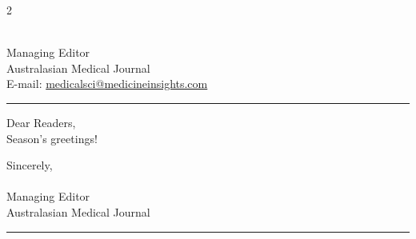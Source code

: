 \documentclass{article}
\begin{document}
\begin{multicols*}{2}
\sloppy
\raggedcolumns
\setlength{\parindent}{0pt}
\setlength{\parskip}{0pt}
\fontsize{10}{12}\sffamily\color{color_29791}
\par
\vspace*{-5pt}
{\setlength{\leftskip}{8pt}
\\[0.3em]
Managing Editor\\
Australasian Medical Journal\\
E-mail: \textcolor{color_33106}{\href{mailto:medicalsci@medicineinsights.com}{medicalsci@medicineinsights.com}}\par}

\noindent\rule{\linewidth}{2.2pt}
\vspace*{-7pt}

\begin{otherlanguage}{\VAR{lang_name}}
\noindent Dear Readers,\\[1em]  
\noindent Season's greetings!\\[1em]
\noindent {}
\end{otherlanguage}

\vspace{2em}

\noindent
\begin{minipage}{\linewidth}
\noindent Sincerely,
\\[1em]
\\
Managing Editor\\
Australasian Medical Journal\\[0.5em]
\noindent\rule{\linewidth}{2.2pt}
\end{minipage}

\end{multicols*}
\end{document}
